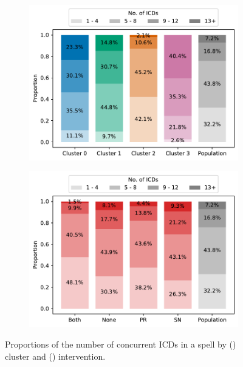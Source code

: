 \begin{figure}
    \centering
    \begin{subfigure}{.5\imgwidth}
        \includegraphics[width=\linewidth]{cluster_icds}
        \caption{}\label{fig:cluster_icds}
    \end{subfigure}\hfill%
    \begin{subfigure}{.5\imgwidth}
        \includegraphics[width=\linewidth]{intervention_icds}
        \caption{}\label{fig:intervention_icds}
    \end{subfigure}
    \caption{%
        Proportions of the number of concurrent ICDs in a spell by
        () cluster and ()
        intervention.
    }\label{fig:icds}
\end{figure}

